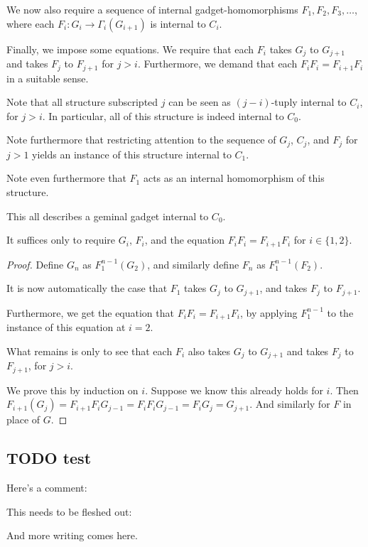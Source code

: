 We now also require a sequence of internal gadget-homomorphisms $F_1, F_2, F_3, \ldots$, where each $F_i : G_i \to \Gamma_i(G_{i + 1})$ is internal to $C_i$.

Finally, we impose some equations. We require that each $F_i$ takes $G_j$ to $G_{j + 1}$ and takes $F_j$ to $F_{j + 1}$ for $j > i$. Furthermore, we demand that each $F_i F_i = F_{i + 1} F_i$ in a suitable sense.

Note that all structure subscripted $j$ can be seen as $(j - i)$-tuply internal to $C_i$, for $j > i$. In particular, all of this structure is indeed internal to $C_0$.

Note furthermore that restricting attention to the sequence of $G_j$, $C_j$, and $F_j$ for $j > 1$ yields an instance of this structure internal to $C_1$.

Note even furthermore that $F_1$ acts as an internal homomorphism of this structure.

This all describes a geminal gadget internal to $C_0$.

\begin{theorem}
It suffices only to require $G_i$, $F_i$, and the equation $F_i F_i = F_{i + 1} F_i$ for $i \in \{1, 2\}$.
\end{theorem}
\begin{proof}
Define $G_n$ as $F_1^{n - 1}(G_2)$, and similarly define $F_n$ as $F_1^{n - 1}(F_2)$.

It is now automatically the case that $F_1$ takes $G_j$ to $G_{j + 1}$, and takes $F_j$ to $F_{j + 1}$.

Furthermore, we get the equation that $F_i F_i = F_{i + 1} F_i$, by applying $F_1^{n - 1}$ to the instance of this equation at $i = 2$.

What remains is only to see that each $F_i$ also takes $G_j$ to $G_{j + 1}$ and takes $F_j$ to $F_{j + 1}$, for $j > i$.

We prove this by induction on $i$. Suppose we know this already holds for $i$. Then $F_{i + 1}(G_j) = F_{i + 1} F_i G_{j - 1} = F_i F_i G_{j - 1} = F_i G_j = G_{j + 1}$. And similarly for $F$ in place of $G$.
\end{proof}

\subsection{TODO test}
Here's a comment: 

This needs to be fleshed out: \sTODO


And more writing comes here.

\fileend